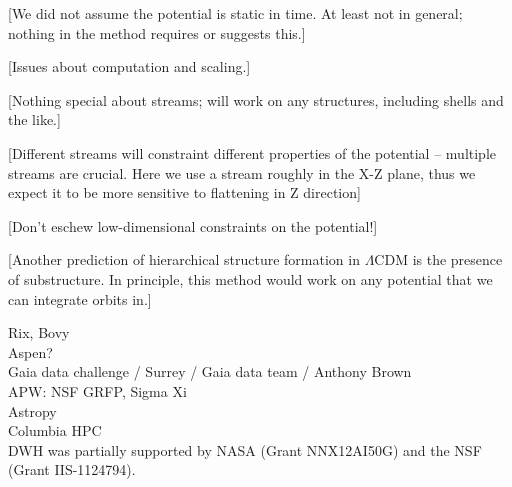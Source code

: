 \documentclass[letterpaper,12pt,preprint]{aastex}
\begin{document}
[We did not assume the potential is static in time.  At least not in
  general; nothing in the method requires or suggests this.]

[Issues about computation and scaling.]

[Nothing special about streams; will work on any structures, including
  shells and the like.]

[Different streams will constraint different properties of the potential -- multiple streams are crucial. Here we use a stream roughly in the X-Z plane, thus we expect it to be more sensitive to flattening in Z direction]

[Don't eschew low-dimensional constraints on the potential!]

[Another prediction of hierarchical structure formation in $\Lambda$CDM is the presence of substructure. In principle, this method would work on any potential that we can integrate orbits in.]

\acknowledgements
Rix, Bovy\\
Aspen?\\
Gaia data challenge / Surrey / Gaia data team / Anthony Brown \\ %
APW: NSF GRFP, Sigma Xi\\
Astropy\\
Columbia HPC\\
DWH was partially supported by NASA (Grant NNX12AI50G) and the NSF (Grant IIS-1124794).



\end{document}
